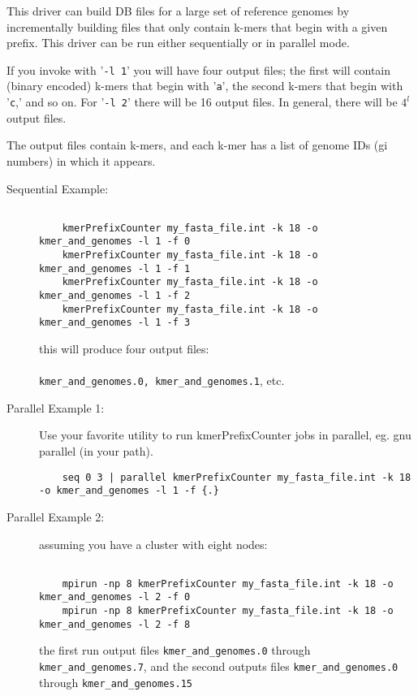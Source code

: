 \documentclass[11pt]{article}
\begin{document}
  This driver can build DB files for a large set of reference genomes by
  incrementally building files that only contain k-mers that begin with
  a given prefix. This driver can be run either sequentially or in
  parallel mode.

  If you invoke with '\texttt{-l 1}' you will have four output files; the first will
  contain (binary encoded) k-mers that begin with '\texttt{a}', the second k-mers that
  begin with '\texttt{c},' and so on. For '\texttt{-l 2}' there will be 16 output files.
  In general, there will be $4^l$ output files.

  The output files contain k-mers, and each k-mer has a list of genome IDs
  (gi numbers) in which it appears.

\begin{description}

 \item[Sequential Example:]
 
  \begin{verbatim}
  
    kmerPrefixCounter my_fasta_file.int -k 18 -o kmer_and_genomes -l 1 -f 0
    kmerPrefixCounter my_fasta_file.int -k 18 -o kmer_and_genomes -l 1 -f 1
    kmerPrefixCounter my_fasta_file.int -k 18 -o kmer_and_genomes -l 1 -f 2
    kmerPrefixCounter my_fasta_file.int -k 18 -o kmer_and_genomes -l 1 -f 3
    \end{verbatim}
    
  this will produce four output files: \\
  \\
    \texttt{kmer\_and\_genomes.0, kmer\_and\_genomes.1}, etc.

  \item[Parallel Example 1:]
  Use your favorite utility to run kmerPrefixCounter jobs in parallel, eg. gnu parallel (in your path).
  \begin{verbatim}
    seq 0 3 | parallel kmerPrefixCounter my_fasta_file.int -k 18 -o kmer_and_genomes -l 1 -f {.}
  \end{verbatim}




  \item[Parallel Example 2:]


  assuming you have a cluster with eight nodes:\\
  \begin{verbatim}
  
    mpirun -np 8 kmerPrefixCounter my_fasta_file.int -k 18 -o kmer_and_genomes -l 2 -f 0
    mpirun -np 8 kmerPrefixCounter my_fasta_file.int -k 18 -o kmer_and_genomes -l 2 -f 8
    \end{verbatim}
  the first run output files \texttt{kmer\_and\_genomes.0} through \texttt{kmer\_and\_genomes.7},
  and the second outputs files \texttt{kmer\_and\_genomes.0} through \texttt{kmer\_and\_genomes.15}



\end{description}
\end{document}
